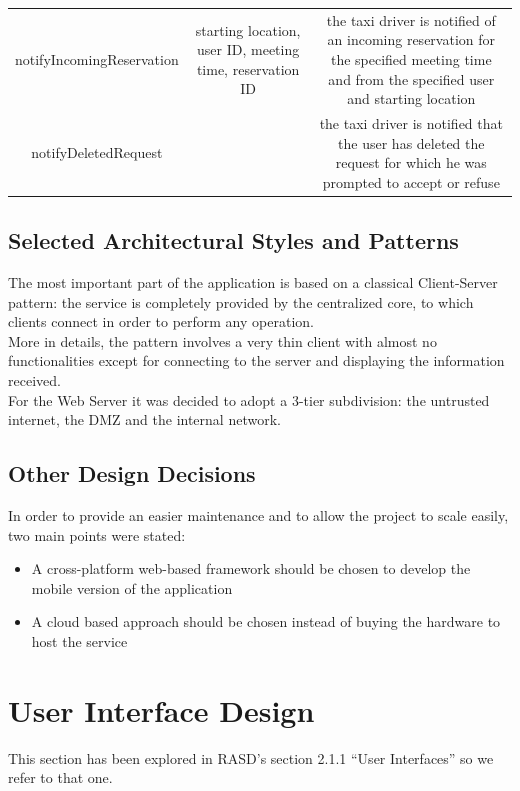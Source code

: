 \documentclass{article}
\begin{document}
\begin{itemize}
\begin{itemize}
\begin{adjustbox}{width=1.2\textwidth}
\begin{tabular}{*{3}{c}}
				notifyIncomingReservation & starting location, user ID, meeting time, reservation ID & the taxi driver is notified of an incoming reservation for the specified meeting time and from the specified user and starting location \\
				notifyDeletedRequest & & the taxi driver is notified that the user has deleted the request for which he was prompted to accept or refuse\\
				\bottomrule
			\end{tabular}
		\end{adjustbox}	
\end{itemize}		
\end{itemize}
\subsection{Selected Architectural Styles and Patterns}
The most important part of the application is based on a classical Client-Server pattern: the service is completely provided by the centralized core, to which clients connect in order to perform any operation.\\
More in details, the pattern involves a very thin client with almost no functionalities except for connecting to the server and displaying the information received.\\
For the Web Server it was decided to adopt a 3-tier subdivision: the untrusted internet, the DMZ and the internal network.
\subsection{Other Design Decisions}
In order to provide an easier maintenance and to allow the project to scale easily, two main points were stated: 
\begin{itemize}
	\item A cross-platform web-based framework should be chosen to develop the mobile version of the application 
	\item A cloud based approach should be chosen instead of buying the hardware to host the service
\end{itemize}

	\section{User Interface Design}
	This section has been explored in RASD's section 2.1.1 ``User Interfaces'' so we refer to that one.
\end{document}

